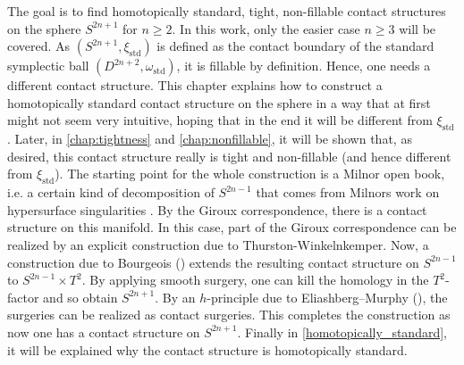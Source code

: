 The goal is to find homotopically standard, tight, non-fillable contact structures on the sphere $S^{2n+1}$ for $n \geq 2$.
In this work, only the easier case $n \geq 3$ will be covered.
As $(S^{2n+1}, \xi_\mathrm{std})$ is defined as the contact boundary of the standard symplectic ball $(D^{2n+2}, \omega_\mathrm{std})$,
it is fillable by definition.
Hence, one needs a different contact structure.
This chapter explains how to construct a homotopically standard contact structure on the sphere in a way that at first might not seem very intuitive,
hoping that in the end it will be different from $\xi_\mathrm{std}$.
Later, in \cref{chap:tightness} and \cref{chap:nonfillable}, it will be shown that, as desired, this contact structure really is tight and non-fillable 
(and hence different from $\xi_\mathrm{std}$).
The starting point for the whole construction is a Milnor open book, i.e. a certain kind of decomposition of $S^{2n-1}$ that comes from
Milnors work on hypersurface singularities \cite{Milnor69}.
By the Giroux correspondence, there is a contact structure on this manifold.
In this case, part of the Giroux correspondence can be realized by an explicit construction due to Thurston-Winkelnkemper.
Now, a construction due to Bourgeois (\cite{Bourgeois02}) extends the resulting contact structure on $S^{2n-1}$ to $S^{2n-1}\times T^2$.
By applying smooth surgery, one can kill the homology in the $T^2$-factor and so obtain $S^{2n+1}$.
By an $h$-principle due to Eliashberg--Murphy (\cite[section 12.4]{EM02}), the surgeries can be realized as contact surgeries.
This completes the construction as now one has a contact structure on $S^{2n+1}$.
Finally in \cref{homotopically_standard}, it will be explained why the contact structure is homotopically standard.